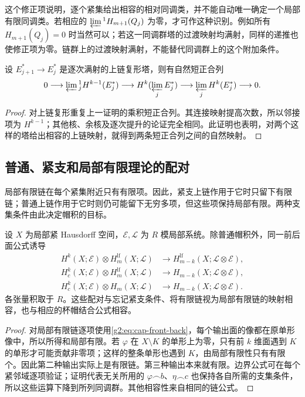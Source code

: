 这个修正项说明，逐个紧集给出相容的相对同调类，并不能自动唯一确定一个局部有限同调类。若相应的 \(\varprojlim{}^1H_{m+1}(Q_j)\) 为零，才可作这种识别。例如所有 \(H_{m+1}(Q_j)=0\) 时当然可以；若这一同调群塔的过渡映射均满射，同样的递推也使修正项为零。链群上的过渡映射满射，不能替代同调群上的这个附加条件。

\begin{corollary}\label{g2:cor:cochain-limit-sequence}
	设 \(E_{j+1}^*\to E_j^*\) 是逐次满射的上链复形塔，则有自然短正合列
	\begin{equation}\label{g2:eq:cochain-limit-sequence}
		0\longrightarrow\varprojlim{}^1_j H^{k-1}(E_j^*)
		\longrightarrow H^k(\varprojlim_j E_j^*)
		\longrightarrow\varprojlim_j H^k(E_j^*)\longrightarrow0.
	\end{equation}
\end{corollary}
\begin{proof}
	对上链复形重复上一证明的乘积短正合列。其连接映射提高次数，所以邻接项为 \(H^{k-1}\)；其他核、余核及逐次提升的论证完全相同。此证明也表明，对两个这样的塔给出相容的上链映射，就得到两条短正合列之间的自然映射。
\end{proof}

\subsection{普通、紧支和局部有限理论的配对}
\label{g2:subsec:0602:04}
局部有限链在每个紧集附近只有有限项。因此，紧支上链作用于它时只留下有限链；普通上链作用于它时则仍可能留下无穷多项，但这些项保持局部有限。两种支集条件由此决定帽积的目标。

\begin{proposition}\label{g2:prop:support-cap-pairings}
	设 \(X\) 为局部紧 Hausdorff 空间，\(\mathcal E,\mathcal L\) 为 \(R\) 模局部系统。除普通帽积外，同一前后面公式诱导
	\[
		\begin{aligned}
			H^k(X;\mathcal E)\otimes H_m^{\mathrm{lf}}(X;\mathcal L)
			&\longrightarrow H_{m-k}^{\mathrm{lf}}(X;\mathcal L\otimes\mathcal E),\\
			H_c^k(X;\mathcal E)\otimes H_m^{\mathrm{lf}}(X;\mathcal L)
			&\longrightarrow H_{m-k}(X;\mathcal L\otimes\mathcal E),\\
			H_c^k(X;\mathcal E)\otimes H_m(X;\mathcal L)
			&\longrightarrow H_{m-k}(X;\mathcal L\otimes\mathcal E).
		\end{aligned}
	\]
	各张量积取于 \(R\)。这些配对与忘记紧支条件、将有限链视为局部有限链的映射相容，也与相应的杯帽结合公式相容。
\end{proposition}
\begin{proof}
	对局部有限链逐项使用\eqref{g2:eq:cap-front-back}，每个输出面的像都在原单形像中，所以所得和局部有限。若 \(\varphi\) 在 \(X\setminus K\) 的单形上为零，只有前 \(k\) 维面遇到 \(K\) 的单形才可能贡献非零项；这样的整条单形也遇到 \(K\)，由局部有限性只有有限个。因此第二种输出实际上是有限链。第三种输出本来就有限。边界公式可在每个紧邻域逐项验证；证明代表无关所用的 \(\varphi\frown b\)、\(\eta\frown c\) 也保持各自所需的支集条件，所以这些运算下降到所列同调群。其他相容性来自相同的链公式。
\end{proof}

